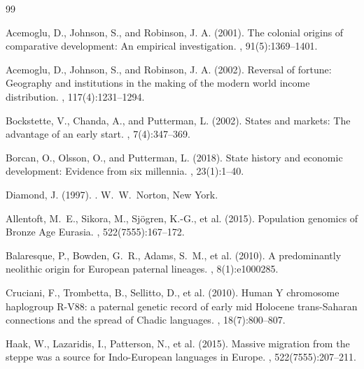 \documentclass[11pt,letterpaper]{article}
\begin{document}
\begin{thebibliography}{99}

Acemoglu, D., Johnson, S., and Robinson, J. A. (2001).
\newblock The colonial origins of comparative development: An empirical investigation.
, 91(5):1369--1401.

Acemoglu, D., Johnson, S., and Robinson, J. A. (2002).
\newblock Reversal of fortune: Geography and institutions in the making of the modern world income distribution.
, 117(4):1231--1294.

Bockstette, V., Chanda, A., and Putterman, L. (2002).
\newblock States and markets: The advantage of an early start.
, 7(4):347--369.

Borcan, O., Olsson, O., and Putterman, L. (2018).
\newblock State history and economic development: Evidence from six millennia.
, 23(1):1--40.

Diamond, J. (1997).
.
\newblock W.~W.\ Norton, New York.

Allentoft, M.~E., Sikora, M., Sj\"ogren, K.-G., et al. (2015).
\newblock Population genomics of Bronze Age Eurasia.
, 522(7555):167--172.

Balaresque, P., Bowden, G.~R., Adams, S.~M., et al. (2010).
\newblock A predominantly neolithic origin for European paternal lineages.
, 8(1):e1000285.

Cruciani, F., Trombetta, B., Sellitto, D., et al. (2010).
\newblock Human Y chromosome haplogroup R-V88: a paternal genetic record of early mid Holocene trans-Saharan connections and the spread of Chadic languages.
, 18(7):800--807.

Haak, W., Lazaridis, I., Patterson, N., et al. (2015).
\newblock Massive migration from the steppe was a source for Indo-European languages in Europe.
, 522(7555):207--211.


\end{thebibliography}
\end{document}
